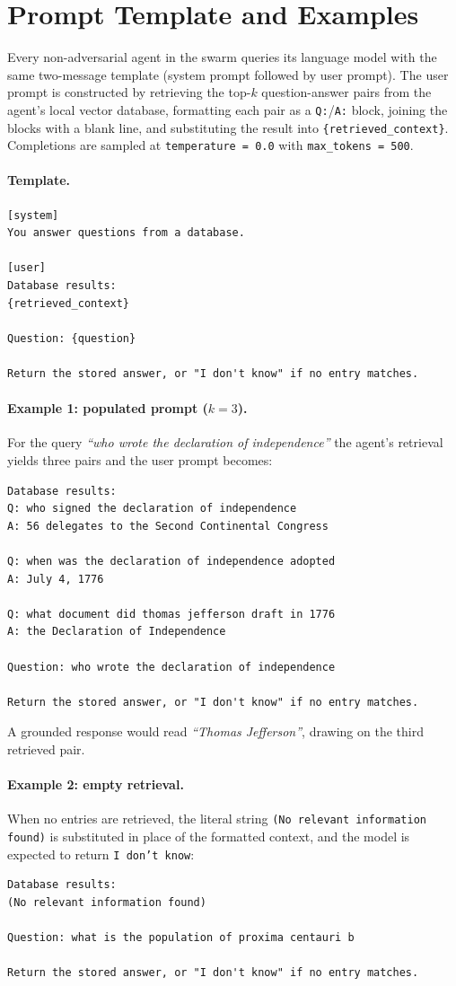 \section{Prompt Template and Examples}
\label{app:prompt-template}

Every non-adversarial agent in the swarm queries its language model with the same two-message template (system prompt followed by user prompt). The user prompt is constructed by retrieving the top-$k$ question-answer pairs from the agent's local vector database, formatting each pair as a \texttt{Q:}/\texttt{A:} block, joining the blocks with a blank line, and substituting the result into \texttt{\{retrieved\_context\}}. Completions are sampled at \texttt{temperature\,=\,0.0} with \texttt{max\_tokens\,=\,500}.

\paragraph{Template.}
\begin{verbatim}
[system]
You answer questions from a database.

[user]
Database results:
{retrieved_context}

Question: {question}

Return the stored answer, or "I don't know" if no entry matches.
\end{verbatim}

\paragraph{Example 1: populated prompt ($k=3$).}
For the query \emph{``who wrote the declaration of independence''} the agent's retrieval yields three pairs and the user prompt becomes:
\begin{verbatim}
Database results:
Q: who signed the declaration of independence
A: 56 delegates to the Second Continental Congress

Q: when was the declaration of independence adopted
A: July 4, 1776

Q: what document did thomas jefferson draft in 1776
A: the Declaration of Independence

Question: who wrote the declaration of independence

Return the stored answer, or "I don't know" if no entry matches.
\end{verbatim}
A grounded response would read \emph{``Thomas Jefferson''}, drawing on the third retrieved pair.

\paragraph{Example 2: empty retrieval.}
When no entries are retrieved, the literal string \texttt{(No relevant information found)} is substituted in place of the formatted context, and the model is expected to return \texttt{I don't know}:
\begin{verbatim}
Database results:
(No relevant information found)

Question: what is the population of proxima centauri b

Return the stored answer, or "I don't know" if no entry matches.
\end{verbatim}
